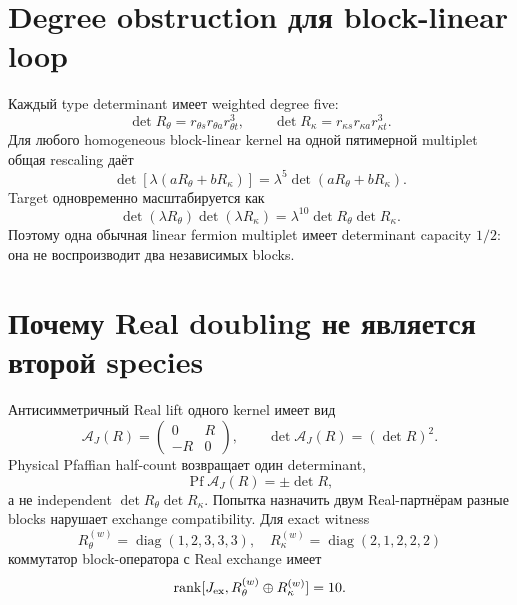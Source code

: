 \section{Degree obstruction для block-linear loop}

Каждый type determinant имеет weighted degree five:
\begin{equation}
 \det R_\theta=r_{\theta s}r_{\theta a}r_{\theta t}^{3},
 \qquad
 \det R_\kappa=r_{\kappa s}r_{\kappa a}r_{\kappa t}^{3}.
 \label{eq:v9-kms-physical-loop-single-determinants}
\end{equation}
Для любого homogeneous block-linear kernel на одной пятимерной multiplet
общая rescaling даёт
\begin{equation}
 \det\!\left[\lambda(aR_\theta+bR_\kappa)\right]
 =\lambda^5\det(aR_\theta+bR_\kappa).
 \label{eq:v9-kms-physical-loop-linear-degree}
\end{equation}
Target одновременно масштабируется как
\begin{equation}
 \det(\lambda R_\theta)\det(\lambda R_\kappa)
 =\lambda^{10}\det R_\theta\det R_\kappa.
 \label{eq:v9-kms-physical-loop-target-degree}
\end{equation}
Поэтому одна обычная linear fermion multiplet имеет determinant capacity
$1/2$: она не воспроизводит два независимых blocks.

\section{Почему Real doubling не является второй species}

Антисимметричный Real lift одного kernel имеет вид
\begin{equation}
 \mathcal A_J(R)=
 \begin{pmatrix}0&R\\-R&0\end{pmatrix},
 \qquad
 \det\mathcal A_J(R)=(\det R)^2.
 \label{eq:v9-kms-physical-loop-real-lift}
\end{equation}
Physical Pfaffian half-count возвращает один determinant,
\begin{equation}
 \operatorname{Pf}\mathcal A_J(R)=\pm\det R,
 \label{eq:v9-kms-physical-loop-pfaffian}
\end{equation}
а не independent $\det R_\theta\det R_\kappa$. Попытка назначить двум
Real-партнёрам разные blocks нарушает exchange compatibility. Для exact
witness
\begin{equation}
 R_\theta^{(w)}=\operatorname{diag}(1,2,3,3,3),
 \quad
 R_\kappa^{(w)}=\operatorname{diag}(2,1,2,2,2)
 \label{eq:v9-kms-physical-loop-real-witness}
\end{equation}
коммутатор block-оператора с Real exchange имеет
\begin{equation}
 \operatorname{rank}[J_{\rm ex},R_\theta^{(w)}\oplus R_\kappa^{(w)}]=10.
 \label{eq:v9-kms-physical-loop-real-mismatch}
\end{equation}


